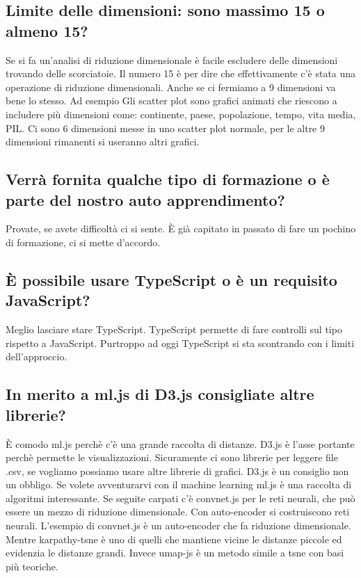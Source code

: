 \documentclass{article}
\begin{document}
    \subsection{Limite delle dimensioni: sono massimo 15 o almeno 15?}
    \label{sub:domanda_14}
    Se si fa un'analisi di riduzione dimensionale è facile escludere delle dimensioni trovando delle scorciatoie. Il numero 15 è per dire che effettivamente c'è stata una operazione di riduzione dimensionali. Anche se ci fermiamo a 9 dimensioni va bene lo stesso.
    Ad esempio
    Gli scatter plot sono grafici animati che riescono a includere più dimensioni come: continente, paese, popolazione, tempo, vita media, PIL. Ci sono 6 dimensioni messe in uno scatter plot normale, per le altre 9 dimensioni rimanenti si useranno altri grafici.

    \subsection{Verrà fornita qualche tipo di formazione o è parte del nostro auto apprendimento?}
    \label{sub:domanda_15}
    Provate, se avete difficoltà ci si sente. È già capitato in passato di fare un pochino di formazione, ci si mette d'accordo.

    \subsection{È possibile usare TypeScript o è un requisito JavaScript?}
    \label{sub:domanda_16}
    Meglio lasciare stare TypeScript. TypeScript permette di fare controlli sul tipo rispetto a JavaScript. Purtroppo ad oggi TypeScript si sta scontrando con i limiti dell'approccio.

    \subsection{In merito a ml.js di D3.js consigliate altre librerie?}
    \label{sub:domanda_17}
    È comodo ml.js perchè c'è una grande raccolta di distanze. D3.js è l'asse portante perchè permette le visualizzazioni. Sicuramente ci sono librerie per leggere file .csv, se vogliamo possiamo usare altre librerie di grafici. D3.js è un consiglio non un obbligo. Se volete avventurarvi con il machine learning ml.js è una raccolta di algoritmi interessante. Se seguite carpati c'è convnet.js per le reti neurali, che può essere un mezzo di riduzione dimensionale. Con auto-encoder si costruiscono reti neurali. L'esempio di convnet.js è un auto-encoder che fa riduzione dimensionale. Mentre karpathy-tsne è uno di quelli che mantiene vicine le distanze piccole ed evidenzia le distanze grandi. Invece umap-js è un metodo simile a tsne con basi più teoriche. 
\end{document}
